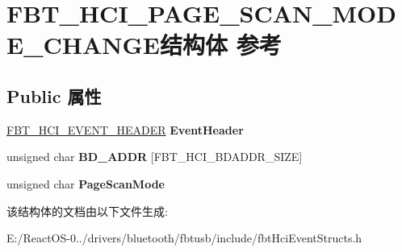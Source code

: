 \hypertarget{struct_f_b_t___h_c_i___p_a_g_e___s_c_a_n___m_o_d_e___c_h_a_n_g_e}{}\section{F\+B\+T\+\_\+\+H\+C\+I\+\_\+\+P\+A\+G\+E\+\_\+\+S\+C\+A\+N\+\_\+\+M\+O\+D\+E\+\_\+\+C\+H\+A\+N\+G\+E结构体 参考}
\label{struct_f_b_t___h_c_i___p_a_g_e___s_c_a_n___m_o_d_e___c_h_a_n_g_e}
\subsection*{Public 属性}
\begin{DoxyCompactItemize}
\item 
\mbox{\label{struct_f_b_t___h_c_i___p_a_g_e___s_c_a_n___m_o_d_e___c_h_a_n_g_e_af41d80c00194bf5ad28891a37f6a2295}} 
\hyperlink{struct_f_b_t___h_c_i___e_v_e_n_t___h_e_a_d_e_r}{F\+B\+T\+\_\+\+H\+C\+I\+\_\+\+E\+V\+E\+N\+T\+\_\+\+H\+E\+A\+D\+ER} {\bfseries Event\+Header}
\item 
\mbox{\label{struct_f_b_t___h_c_i___p_a_g_e___s_c_a_n___m_o_d_e___c_h_a_n_g_e_aee3b65434d996d6a89518845d8b41e80}} 
unsigned char {\bfseries B\+D\+\_\+\+A\+D\+DR} \mbox{[}F\+B\+T\+\_\+\+H\+C\+I\+\_\+\+B\+D\+A\+D\+D\+R\+\_\+\+S\+I\+ZE\mbox{]}
\item 
\mbox{\label{struct_f_b_t___h_c_i___p_a_g_e___s_c_a_n___m_o_d_e___c_h_a_n_g_e_a3fc0456f3a372f5a2809974a9cefd95c}} 
unsigned char {\bfseries Page\+Scan\+Mode}
\end{DoxyCompactItemize}


该结构体的文档由以下文件生成\+:\begin{DoxyCompactItemize}
\item 
E\+:/\+React\+O\+S-\/0../drivers/bluetooth/fbtusb/include/fbt\+Hci\+Event\+Structs.\+h\end{DoxyCompactItemize}
